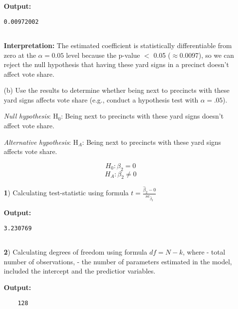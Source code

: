 \documentclass[12pt,letterpaper]{article}
\begin{document}
\begin{enumerate}
\noindent \textbf{Output: }
\begin{verbatim}
0.00972002
	
\end{verbatim}  
\vspace{.25cm}

	\noindent \textbf{Interpretation:} The estimated coefficient is statistically differentiable from zero at the $\alpha=0.05$ level because the p-value $<$ 0.05 ($\approx $0.0097), so we can reject the null hypothesis that having these yard signs in a precinct doesn't affect vote share. \vspace{.5cm}

	\item [(b)]  Use the results to determine whether being
	next to precincts with these yard signs affects vote
	share (e.g., conduct a hypothesis test with $\alpha = .05$).
	
	\noindent \textit{Null hypothesis}: $\text{H}_0$: Being next to precincts with these yard signs doesn't affect vote share.

\noindent \textit{Alternative hypothesis}: $\text{H}_A$: Being next to precincts with these yard signs affects vote share.

$$H_0: \beta_2 = 0$$
$$H_A: \beta_2 \neq 0$$

\vspace{0.5cm}

\noindent \textbf 1) Calculating test-statistic using formula $ t = \frac{\hat{\beta}_2 - 0}{se_{\hat{\beta}_2}}$

  
\vspace{.25cm}

\noindent \textbf{Output: }
\begin{verbatim}
3.230769
	
\end{verbatim}  
\vspace{.25cm}

\noindent \textbf 2) Calculating degrees of freedom using formula $ df = N-k $, where  - total number of observations,  - the number of parameters estimated in the model, included the intercept and the predictior variables.
\vspace{0.5cm}


  
\vspace{.25cm}

\noindent \textbf{Output: }
\begin{verbatim}
	128
	

\end{verbatim}
\end{enumerate}
\end{document}
